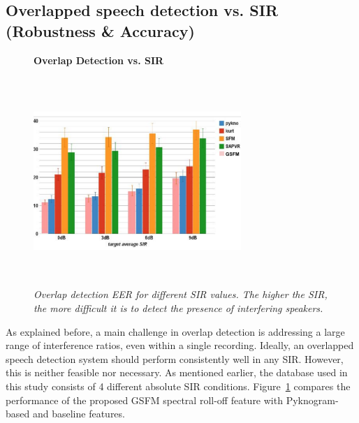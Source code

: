 {\subsection{Overlapped speech detection vs. SIR (Robustness \& Accuracy)}
\label{sssec:ovl_frame_vs_sir_gsfm}
\begin{figure}[b!]
	\centering
	\hspace{-1mm}
	\textbf{Overlap Detection vs. SIR}\par\medskip
	\includegraphics[height = 3.1in, width=0.7\textwidth]{figures/ovl_det_vs_sir_gsfm}
	\vspace{-1mm}
	\caption{\it Overlap detection EER for different SIR values. The higher the SIR, the more difficult it is to detect the presence of interfering speakers.}
	\vspace{0mm}
	\label{fig:ovl_det_gsfm}
\end{figure}

As explained before, a main challenge in overlap detection is addressing a large range of interference ratios, even within a single recording. 
Ideally, an overlapped speech detection system should perform consistently well in any SIR. 
However, this is neither feasible nor necessary. 
As mentioned earlier, the database used in this study consists of 4 different absolute SIR conditions. 
Figure~\ref{fig:ovl_det_gsfm} compares the performance of the proposed GSFM spectral roll-off feature with Pyknogram-based and baseline features.

}
